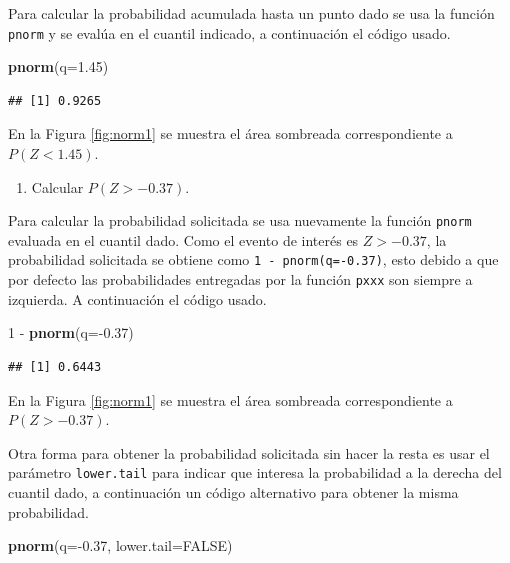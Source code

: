 \documentclass[10pt,]{krantz}
\makeatletter
\newenvironment{Shaded}{\begin{snugshade}}{\end{snugshade}}
\newcommand{\KeywordTok}[1]{\textcolor[rgb]{0.13,0.29,0.53}{\textbf{{#1}}}}
\newcommand{\DataTypeTok}[1]{\textcolor[rgb]{0.13,0.29,0.53}{{#1}}}
\newcommand{\DecValTok}[1]{\textcolor[rgb]{0.00,0.00,0.81}{{#1}}}
\newcommand{\FloatTok}[1]{\textcolor[rgb]{0.00,0.00,0.81}{{#1}}}
\newcommand{\StringTok}[1]{\textcolor[rgb]{0.31,0.60,0.02}{{#1}}}
\newcommand{\OtherTok}[1]{\textcolor[rgb]{0.56,0.35,0.01}{{#1}}}
\newcommand{\NormalTok}[1]{{#1}}
\providecommand{\tightlist}{%
  \setlength{\itemsep}{0pt}\setlength{\parskip}{0pt}}
\newenvironment{kframe}{%
\medskip{}
\setlength{\fboxsep}{.8em}
 \def\at@end@of@kframe{}%
 \ifinner\ifhmode%
  \def\at@end@of@kframe{\end{minipage}}%
  \begin{minipage}{\columnwidth}%
 \fi\fi%
 \def\FrameCommand##1{\hskip\@totalleftmargin \hskip-\fboxsep
 \colorbox{shadecolor}{##1}\hskip-\fboxsep
     \hskip-\linewidth \hskip-\@totalleftmargin \hskip\columnwidth}%
 \MakeFramed {\advance\hsize-\width
   \@totalleftmargin\z@ \linewidth\hsize
   \@setminipage}}%
 {\par\unskip\endMakeFramed%
 \at@end@of@kframe}
\renewenvironment{Shaded}{\begin{kframe}}{\end{kframe}}
\makeatother
\begin{document}
Para calcular la probabilidad acumulada hasta un punto dado se usa la
función \texttt{pnorm} y se evalúa en el cuantil indicado, a
continuación el código usado.

\begin{Shaded}
\begin{Highlighting}[]
\KeywordTok{pnorm}\NormalTok{(}\DataTypeTok{q=}\FloatTok{1.45}\NormalTok{)}
\end{Highlighting}
\end{Shaded}

\begin{verbatim}
## [1] 0.9265
\end{verbatim}

En la Figura \ref{fig:norm1} se muestra el área sombreada
correspondiente a \(P(Z < 1.45)\).

\begin{enumerate}
\def\labelenumi{\arabic{enumi})}
\setcounter{enumi}{1}
\tightlist
\item
  Calcular \(P(Z > -0.37)\).
\end{enumerate}

Para calcular la probabilidad solicitada se usa nuevamente la función
\texttt{pnorm} evaluada en el cuantil dado. Como el evento de interés es
\(Z > -0.37\), la probabilidad solicitada se obtiene como
\texttt{1\ -\ pnorm(q=-0.37)}, esto debido a que por defecto las
probabilidades entregadas por la función \texttt{pxxx} son siempre a
izquierda. A continuación el código usado.

\begin{Shaded}
\begin{Highlighting}[]
\DecValTok{1} \NormalTok{-}\StringTok{ }\KeywordTok{pnorm}\NormalTok{(}\DataTypeTok{q=}\NormalTok{-}\FloatTok{0.37}\NormalTok{)}
\end{Highlighting}
\end{Shaded}

\begin{verbatim}
## [1] 0.6443
\end{verbatim}

En la Figura \ref{fig:norm1} se muestra el área sombreada
correspondiente a \(P(Z > -0.37)\).

Otra forma para obtener la probabilidad solicitada sin hacer la resta es
usar el parámetro \texttt{lower.tail} para indicar que interesa la
probabilidad a la derecha del cuantil dado, a continuación un código
alternativo para obtener la misma probabilidad.

\begin{Shaded}
\begin{Highlighting}[]
\KeywordTok{pnorm}\NormalTok{(}\DataTypeTok{q=}\NormalTok{-}\FloatTok{0.37}\NormalTok{, }\DataTypeTok{lower.tail=}\OtherTok{FALSE}\NormalTok{)}
\end{Highlighting}
\end{Shaded}
\end{document}

